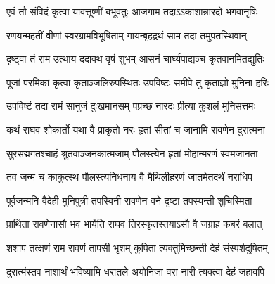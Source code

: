 

\storymeta


\twolineshloka
{एवं तौ संविदं कृत्वा यावत्तूष्णीं बभूवतुः}
{आजगाम तदाऽऽकाशान्नारदो भगवानृषिः}%

\twolineshloka
{रणयन्महतीं वीणां स्वरग्रामविभूषिताम्}
{गायन्बृहद्रथं साम तदा तमुपतस्थिवान्}%

\twolineshloka
{दृष्ट्वा तं राम उत्थाय ददावथ वृषं शुभम्}
{आसनं चार्घ्यपाद्यञ्च कृतवानमितद्युतिः}%

\twolineshloka
{पूजां परमिकां कृत्वा कृताञ्जलिरुपस्थितः}
{उपविष्टः समीपे तु कृताज्ञो मुनिना हरिः}%

\twolineshloka
{उपविष्टं तदा रामं सानुजं दुःखमानसम्}
{पप्रच्छ नारदः प्रीत्या कुशलं मुनिसत्तमः}%

\twolineshloka
{कथं राघव शोकार्तो यथा वै प्राकृतो नरः}
{हृतां सीतां च जानामि रावणेन दुरात्मना}%

\twolineshloka
{सुरसद्मगतश्चाहं श्रुतवाञ्जनकात्मजाम्}
{पौलस्त्येन हृतां मोहान्मरणं स्वमजानता}%

\twolineshloka
{तव जन्म च काकुत्स्थ पौलस्त्यनिधनाय वै}
{मैथिलीहरणं जातमेतदर्थं नराधिप}%

\twolineshloka
{पूर्वजन्मनि वैदेही मुनिपुत्री तपस्विनी}
{रावणेन वने दृष्टा तपस्यन्ती शुचिस्मिता}%

\twolineshloka
{प्रार्थिता रावणेनासौ भव भार्येति राघव}
{तिरस्कृतस्तयाऽसौ वै जग्राह कबरं बलात्}%

\twolineshloka
{शशाप तत्क्षणं राम रावणं तापसी भृशम्}
{कुपिता त्यक्तुमिच्छन्ती देहं संस्पर्शदूषितम्}%

\twolineshloka
{दुरात्मंस्तव नाशार्थं भविष्यामि धरातले}
{अयोनिजा वरा नारी त्यक्त्वा देहं जहावपि}%

